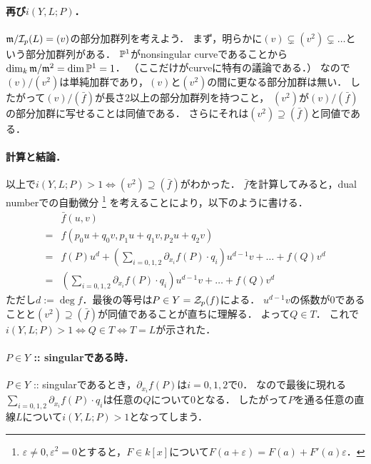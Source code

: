 \documentclass[a4paper]{jsarticle}
\begin{document}
    \paragraph{再び$i(Y, L; P)$．}
    $\mathfrak{m}/\mathcal{I}_p(L)=(v)$の部分加群列を考えよう．
    まず，明らかに$(v) \subsetneq (v^2) \subsetneq \dots$という部分加群列がある．
    $\mathbb{P}^1$がnonsingular curveであることから$\dim _k \mathfrak{m}/\mathfrak{m}^2=\dim \mathbb{P}^1=1$．
    （ここだけがcurveに特有の議論である．）
    なので$(v)/(v^2)$は単純加群であり，$(v)$と$(v^2)$の間に更なる部分加群は無い．
    したがって$(v)/(\bar{f})$が長さ2以上の部分加群列を持つこと，
    $(v^2)$が$(v)/(\bar{f})$の部分加群に写せることは同値である．
    さらにそれは$(v^2) \supseteq (\bar{f})$と同値である．

    \paragraph{計算と結論．}
    以上で$i(Y,L; P)>1 \iff (v^2) \supseteq (\bar{f})$がわかった．
    $\bar{f}$を計算してみると，dual numberでの自動微分
    \footnote{$\varepsilon \neq 0, \varepsilon^2=0$とすると，$F \in k[x]$について$F(a+\varepsilon)=F(a)+F'(a) \varepsilon$．}
    を考えることにより，以下のように書ける．
    \begin{align*}
        {}& \bar{f}(u,v) \\
        =&  f(p_0 u+q_0v, p_1 u+q_1v, p_2 u+q_2v) \\
        =&  f(P)u^d+\left( \sum_{i=0,1,2} \partial_{x_i}f(P) \cdot q_i \right)u^{d-1}v+\dots+f(Q)v^d \\
        =&  \left( \sum_{i=0,1,2} \partial_{x_i}f(P) \cdot q_i \right)u^{d-1}v+\dots+f(Q)v^d
    \end{align*}
    ただし$d:=\deg f$．最後の等号は$P \in Y=\mathcal{Z}_p(f)$による．
    $u^{d-1}v$の係数が0であることと$(v^2) \supseteq (\bar{f})$が同値であることが直ちに理解る．
    よって$Q \in T$．
    これで$i(Y,L; P)>1 \iff Q \in T \iff T=L$が示された．

    \paragraph{$P \in Y$ :: singularである時．}
    $P \in Y$ :: singularであるとき，$\partial_{x_i}f(P)$は$i=0,1,2$で0．
    なので最後に現れる$\sum_{i=0,1,2} \partial_{x_i}f(P) \cdot q_i$は任意の$Q$について0となる．
    したがって$P$を通る任意の直線$L$について$i(Y,L; P)>1$となってしまう．
\end{document}
